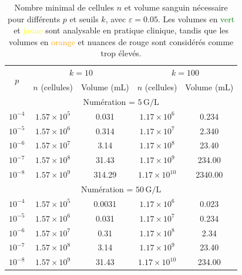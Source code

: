 \begin{table}[H]
    \centering
    \caption{
        Nombre minimal de cellules $n$ et volume sanguin nécessaire pour différents $p$ et seuils $k$, avec $\varepsilon = 0.05$.
        Les volumes en \textcolor{green}{vert} et \textcolor{yellow}{jaune} sont analysable en pratique clinique, tandis que les 
        volumes en \textcolor{orange}{orange} et nuances de \textcolor{mydarkred}{rouge} sont considérés comme trop élevés.
    }
    \label{tab:valeurs_n_volume}
    \begin{tabular}{c|cc|cc}
        \toprule
        \multirow{2}{*}{$p$} & \multicolumn{2}{c|}{$k = 10$} & \multicolumn{2}{c}{$k = 100$} \\
        & $n$ (cellules) & Volume (mL) & $n$ (cellules) & Volume (mL) \\
        \midrule
        \multicolumn{5}{c}{Numération = $5\,\text{G/L}$} \\
        \midrule
        $10^{-4}$ & $1.57 \times 10^{5}$ & \cellcolor{mygreen}0.031 & $1.17 \times 10^{6}$ & \cellcolor{mygreen}0.234 \\
        $10^{-5}$ & $1.57 \times 10^{6}$ & \cellcolor{mygreen}0.314 & $1.17 \times 10^{7}$ & \cellcolor{myyellow}2.340 \\
        $10^{-6}$ & $1.57 \times 10^{7}$ & \cellcolor{myyellow}3.14 & $1.17 \times 10^{8}$ & \cellcolor{myorange}23.40 \\
        $10^{-7}$ & $1.57 \times 10^{8}$ & \cellcolor{myred}31.43 & $1.17 \times 10^{9}$ & \cellcolor{mydarkred}234.00 \\
        $10^{-8}$ & $1.57 \times 10^{9}$ & \cellcolor{mydarkred}314.29 & $1.17 \times 10^{10}$ & \cellcolor{mydeepred}2340.00 \\
        \midrule
        \multicolumn{5}{c}{Numération = $50\,\text{G/L}$} \\
        \midrule
        $10^{-4}$ & $1.57 \times 10^{5}$ & \cellcolor{mygreen}0.0031 & $1.17 \times 10^{6}$ & \cellcolor{mygreen}0.023 \\
        $10^{-5}$ & $1.57 \times 10^{6}$ & \cellcolor{mygreen}0.031 & $1.17 \times 10^{7}$ & \cellcolor{mygreen}0.234 \\
        $10^{-6}$ & $1.57 \times 10^{7}$ & \cellcolor{mygreen}0.31 & $1.17 \times 10^{8}$ & \cellcolor{myyellow}2.34 \\
        $10^{-7}$ & $1.57 \times 10^{8}$ & \cellcolor{myyellow}3.14 & $1.17 \times 10^{9}$ & \cellcolor{myorange}23.40 \\
        $10^{-8}$ & $1.57 \times 10^{9}$ & \cellcolor{myred}31.43 & $1.17 \times 10^{10}$ & \cellcolor{mydarkred}234.00 \\
        \bottomrule
    \end{tabular}
\end{table}

